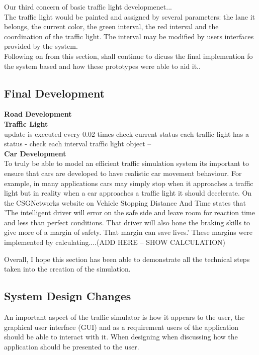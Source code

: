 \documentclass[11pt]{article}
\begin{document}
Our third concern of basic traffic light developmenet...\\
The traffic light would be painted and assigned by several parameters: the lane it belongs, the current color, the green interval, the red interval and the coordination of the traffic light. The interval may be modified by users interfaces provided by the system.
\\
Following on from this section, shall continue to dicuss the final implemention fo the system based and how these prototypes were able to aid it..
	\subsection{Final Development}
	\textbf{Road Development}\\
	\textbf{Traffic Light}\\
	update is executed every 0.02 times 
	check current status
	each traffic light has a status - check each interval 
	traffic light object -- \\
	\textbf{Car Development}\\
	To truly be able to model an efficient traffic simulation system its important to ensure that cars are developed to have realistic car movement behaviour. For example, in many applications cars may simply stop when it approaches a traffic light but in reality when a car approaches a traffic light it should decelerate. On the CSGNetworks website on Vehicle Stopping Distance And Time \cite{CSGNetwork} states that 'The intelligent driver will error on the safe side and leave room for reaction time and less than perfect conditions. That driver will also hone the braking skills to give more of a margin of safety. That margin can save lives.' These margins were implemented by calculating....(ADD HERE -- SHOW CALCULATION)

	Overall, I hope this section has been able to demonstrate all the technical steps taken into the creation of the simulation. 
	
	\subsection{System Design Changes}
	An important aspect of the traffic simulator is how it appears to the user, the graphical user interface (GUI) and as a requirement users of the application should be able to interact with it. When designing when discussing how the application should be presented to the user.
	
\end{document}
